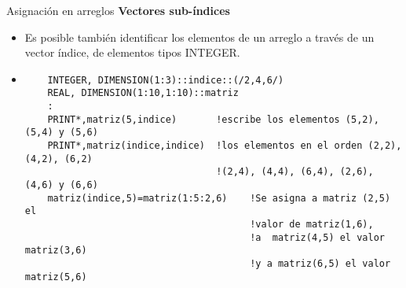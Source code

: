 \begin{frame}[fragile]{Asignación en arreglos}
 \textbf{Vectores sub-índices}
  \begin{itemize}[<+(1)->]
  \item Es posible también identificar los elementos de un arreglo a través de un vector índice, de elementos tipos INTEGER. 
  \vspace{0.15cm}
  \item []
   \begin{verbatim}
    INTEGER, DIMENSION(1:3)::indice::(/2,4,6/)
    REAL, DIMENSION(1:10,1:10)::matriz
    :
    PRINT*,matriz(5,indice)       !escribe los elementos (5,2), (5,4) y (5,6)
    PRINT*,matriz(indice,indice)  !los elementos en el orden (2,2), (4,2), (6,2)
                                  !(2,4), (4,4), (6,4), (2,6), (4,6) y (6,6)
    matriz(indice,5)=matriz(1:5:2,6)    !Se asigna a matriz (2,5) el
                                        !valor de matriz(1,6),
                                        !a  matriz(4,5) el valor matriz(3,6)
                                        !y a matriz(6,5) el valor matriz(5,6)
   \end{verbatim}
 \end{itemize}
\end{frame}